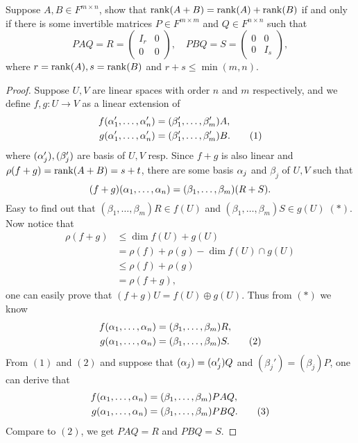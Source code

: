 \begin{pro}%
	Suppose $A,B\in F^{m\times n}$, show that $\operatorname*{rank}(A+B)=\operatorname*{rank}(A)+\operatorname*{rank}(B)$ if and only if there is some invertible matrices $P\in F^{m\times m}$ and $Q\in F^{n\times n}$ such that 
	\[PAQ=R=\begin{pmatrix} I_r & 0\\0 & 0\end{pmatrix},\quad PBQ=S=\begin{pmatrix} 0 & 0\\0 & I_s\end{pmatrix},\]
	where $r=\operatorname*{rank}(A),s=\operatorname*{rank}(B)$ and $r+s\leq \min(m,n)$.
\end{pro}
\begin{proof}
	Suppose $U,V$ are linear spaces with order $n$ and $m$ respectively, and we define $f,g\colon U\to V$ as a linear extension of 
	\begin{align*}
	f(\alpha_1',\dots,\alpha_n')&=(\beta_1',\dots,\beta_m')A,\\
	g(\alpha_1',\dots,\alpha_n')&=(\beta_1',\dots,\beta_m')B.\tag{1}
	\end{align*}
	where $(\alpha_j'),(\beta_j')$ are basis of $U,V$ resp. Since $f+g$ is also linear and $\rho(f+g)=\operatorname*{rank}(A+B)=s+t$, there are some basis $\alpha_j$ and $\beta_j$ of $U,V$ such that
	\[(f+g)(\alpha_1,\dots,\alpha_n)=(\beta_1,\dots,\beta_m)(R+S).\]
	Easy to find out that $(\beta_1,\dots,\beta_m)R\in f(U)$ and $(\beta_1,\dots,\beta_m) S\in g(U)\;(*)$. 
	Now notice that
	\begin{align*}
		\rho(f+g)&\leq \dim f(U)+g(U)\\
				 &=\rho(f)+\rho(g)-\dim f(U)\cap g(U)\\
				 &\leq \rho(f)+\rho(g)\\
				 &=\rho(f+g),
	\end{align*}
	one can easily prove that $(f+g)U=f(U)\oplus g(U)$. Thus from $(*)$ we know 
	\begin{align*}
	f(\alpha_1,\dots,\alpha_n)&=(\beta_1,\dots,\beta_m)R,\\
	g(\alpha_1,\dots,\alpha_n)&=(\beta_1,\dots,\beta_m)S.\tag{2}
	\end{align*}
	From $(1)$ and $(2)$ and suppose that $(\alpha_j)=(\alpha_j')Q$ and $(\beta_j')=(\beta_j)P$, one can derive that
	\begin{align*}
	f(\alpha_1,\dots,\alpha_n)&=(\beta_1,\dots,\beta_m)PAQ,\\
	g(\alpha_1,\dots,\alpha_n)&=(\beta_1,\dots,\beta_m)PBQ.\tag{3}
	\end{align*}
	Compare to $(2)$, we get $PAQ=R$ and $PBQ=S$.
\end{proof}


